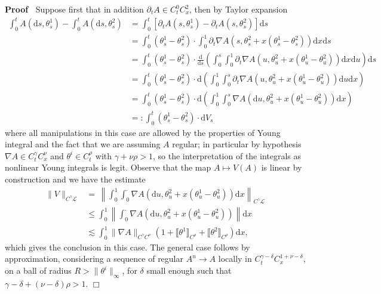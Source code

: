 \documentclass[10pt]{article}
\newcommand{\backassign}{=:}
\newcommand{\mathd}{\mathrm{d}}
\newenvironment{proof}{\noindent\textbf{Proof\ }}{\hspace*{\fill}$\Box$\medskip}
\begin{document}
\begin{proof}
  Suppose first that in addition $\partial_t A \in C^0_t C^2_x$, then by
  Taylor expansion
%  
  \begin{align*}
    \int_0^t A (\mathd s, \theta^1_s) - \int_0^t A (\mathd s, \theta^2_s) & =
    \int_0^t [\partial_t A (s, \theta^1_s) - \partial_t A (s, \theta^2_s)]
    \mathd s\\
    & = \int_0^t (\theta^1_s - \theta^2_s) \cdot \int_0^1 \partial_t \nabla A
    (s, \theta^2_s + x (\theta^1_s - \theta^2_s)) \mathd x \mathd s\\
    & = \int_0^t (\theta^1_s - \theta^2_s) \cdot \frac{\mathd}{\mathd s}
    \left( \int_0^s \int_0^1 \partial_t \nabla A (u, \theta^2_u + x
    (\theta^1_u - \theta^2_u)) \mathd x \mathd u \right) \mathd s\\
    & = \int_0^t (\theta^1_s - \theta^2_s) \cdot \mathd \left( \int_0^1
    \int_0^s \partial_t \nabla A (u, \theta^2_u + x (\theta^1_u - \theta^2_u))
    \mathd u \mathd x \right)\\
    & = \int_0^t (\theta^1_s - \theta^2_s) \cdot \mathd \left( \int_0^1
    \int_0^s \nabla A (\mathd u, \theta^2_u + x (\theta^1_u - \theta^2_u))
    \mathd x \right)\\
    & \backassign \int_0^t (\theta^1_s - \theta^2_s) \cdot \mathd V_s
  \end{align*}
%  
  where all manipulations in this case are allowed by the properties of Young
  integral and the fact that we are assuming $A$ regular; in particular by
  hypothesis $\nabla A \in C^{\gamma}_t C^{\nu}_x$ and $\theta^i \in
  C^{\rho}_t$ with $\gamma + \nu \rho > 1$, so the interpretation of the
  integrals as nonlinear Young integrals is legit. Observe that the map $A
  \mapsto V (A)$ is linear by construction and we have the estimate
%  
  \begin{align*}
    \| V \|_{C^{\gamma} \mathcal{L}} & = \, \left\| \int_0^1 \int_0^{\cdot}
    \nabla A (\mathd u, \theta^2_u + x (\theta^1_u - \theta^2_u)) \mathd x
    \right\|_{C^{\gamma} \mathcal{L}}\\
    & \leqslant \int_0^1 \left\| \int_0^{\cdot} \nabla A (\mathd u,
    \theta^2_u + x (\theta^1_u - \theta^2_u)) \right\| \mathd x\\
    & \lesssim \int_0^1 \| \nabla A \|_{C^{\gamma} C^{\nu}} (1 + \llbracket
    \theta^1 \rrbracket_{C^{\rho}} + \llbracket \theta^2
    \rrbracket_{C^{\rho}}) \mathd x,
  \end{align*}
%  
  which gives the conclusion in this case. The general case follows by
  approximation, considering a sequence of regular $A^n \rightarrow A$ locally
  in $C^{\gamma - \delta}_t C^{1 + \nu - \delta}_x$, on a ball of radius $R >
  \| \theta^i \|_{\infty}$, for $\delta$ small enough such that $\gamma -
  \delta + (\nu - \delta) \rho > 1$.
\end{proof}
\end{document}
